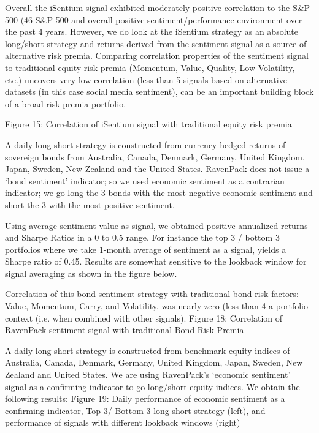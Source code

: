 \documentclass[a4paper]{article}
\begin{document}
Overall the iSentium signal exhibited moderately positive correlation to the S\&P 500 (46%
S\&P 500 and overall positive sentiment/performance environment over the past 4 years. However, we do look at the
iSentium strategy as an absolute long/short strategy and returns derived from the sentiment signal as a source of alternative
risk premia. Comparing correlation properties of the sentiment signal to traditional equity risk premia (Momentum, Value,
Quality, Low Volatility, etc.) uncovers very low correlation (less than 5%
signals based on alternative datasets (in this case social media sentiment), can be an important building block of a broad risk
premia portfolio.

Figure 15: Correlation of iSentium signal with traditional equity risk premia

A daily long-short strategy is constructed from currency-hedged returns of sovereign bonds from Australia, Canada,
Denmark, Germany, United Kingdom, Japan, Sweden, New Zealand and the United States. RavenPack does not issue a
‘bond sentiment’ indicator; so we used economic sentiment as a contrarian indicator; we go long the 3 bonds with the most
negative economic sentiment and short the 3 with the most positive sentiment.

Using average sentiment value as signal, we obtained positive annualized returns and Sharpe Ratios in a 0 to 0.5 range.
For instance the top 3 / bottom 3 portfolios where we take 1-month average of sentiment as a signal, yields a Sharpe ratio of
0.45. Results are somewhat sensitive to the lookback window for signal averaging as shown in the figure below.

Correlation of this bond sentiment strategy with traditional bond risk factors: Value, Momentum, Carry, and Volatility, was
nearly zero (less than 4%
a portfolio context (i.e. when combined with other signals).
Figure 18: Correlation of RavenPack sentiment signal with traditional Bond Risk Premia

A daily long-short strategy is constructed from benchmark equity indices of Australia, Canada, Denmark, Germany, United
Kingdom, Japan, Sweden, New Zealand and United States. We are using RavenPack’s ‘economic sentiment’ signal as a
confirming indicator to go long/short equity indices. We obtain the following results:
Figure 19: Daily performance of economic sentiment as a confirming indicator, Top 3/ Bottom 3 long-short strategy (left), and performance of
signals with different lookback windows (right)
\end{document}

